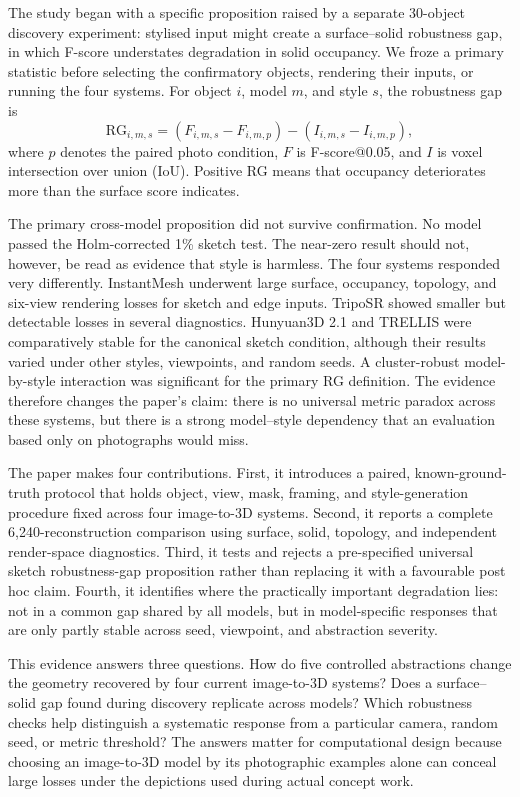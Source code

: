 \documentclass[12pt,a4paper]{article}
\begin{document}
The study began with a specific proposition raised by a separate 30-object discovery experiment: stylised input might create a surface--solid robustness gap, in which F-score understates degradation in solid occupancy. We froze a primary statistic before selecting the confirmatory objects, rendering their inputs, or running the four systems. For object $i$, model $m$, and style $s$, the robustness gap is
\begin{equation}
\mathrm{RG}_{i,m,s}
=
\left(F_{i,m,s}-F_{i,m,p}\right)
-
\left(I_{i,m,s}-I_{i,m,p}\right),
\label{eq:intro_rg}
\end{equation}
where $p$ denotes the paired photo condition, $F$ is F-score@0.05, and $I$ is voxel intersection over union (IoU). Positive RG means that occupancy deteriorates more than the surface score indicates.

The primary cross-model proposition did not survive confirmation. No model passed the Holm-corrected 1\% sketch test. The near-zero result should not, however, be read as evidence that style is harmless. The four systems responded very differently. InstantMesh underwent large surface, occupancy, topology, and six-view rendering losses for sketch and edge inputs. TripoSR showed smaller but detectable losses in several diagnostics. Hunyuan3D 2.1 and TRELLIS were comparatively stable for the canonical sketch condition, although their results varied under other styles, viewpoints, and random seeds. A cluster-robust model-by-style interaction was significant for the primary RG definition. The evidence therefore changes the paper's claim: there is no universal metric paradox across these systems, but there is a strong model--style dependency that an evaluation based only on photographs would miss.

The paper makes four contributions. First, it introduces a paired, known-ground-truth protocol that holds object, view, mask, framing, and style-generation procedure fixed across four image-to-3D systems. Second, it reports a complete 6,240-reconstruction comparison using surface, solid, topology, and independent render-space diagnostics. Third, it tests and rejects a pre-specified universal sketch robustness-gap proposition rather than replacing it with a favourable post hoc claim. Fourth, it identifies where the practically important degradation lies: not in a common gap shared by all models, but in model-specific responses that are only partly stable across seed, viewpoint, and abstraction severity.

This evidence answers three questions. How do five controlled abstractions change the geometry recovered by four current image-to-3D systems? Does a surface--solid gap found during discovery replicate across models? Which robustness checks help distinguish a systematic response from a particular camera, random seed, or metric threshold? The answers matter for computational design because choosing an image-to-3D model by its photographic examples alone can conceal large losses under the depictions used during actual concept work.
\end{document}

